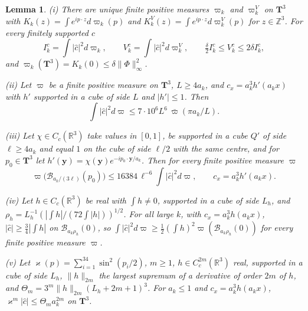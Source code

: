 \documentclass[aps,prd,twocolumn,superscriptaddress,nofootinbib,longbibliography,floatfix,amsmath,amssymb,10pt]{revtex4-2}
\newtheorem{lemma}[theorem]{Lemma}
\theoremstyle{definition}
\theoremstyle{remark}
\newcommand{\R}{\mathbb{R}}
\newcommand{\Z}{\mathbb{Z}}
\begin{document}
\begin{lemma}\label{lem:spatialmeasure}
\textup{(i)} There are unique finite positive measures $\varpi_k$ and
$\varpi^V_k$ on $\mathbf T^3$ with $K_k(z)=\int e^{ip\cdot z}d\varpi_k(p)$
and $K^V_k(z)=\int e^{ip\cdot z}d\varpi^V_k(p)$ for $z\in\Z^3$. For every
finitely supported $c$
\[
I^c_k=\int|\hat c|^2d\varpi_k,\qquad V^c_k=\int|\hat c|^2d\varpi^V_k,
\qquad\tfrac\delta2I^c_k\le V^c_k\le2\delta I^c_k ,
\]
and $\varpi_k(\mathbf T^3)=K_k(0)\le\delta\|\Phi\|_\infty^2$.

\textup{(ii)} Let $\varpi$ be a finite positive measure on $\mathbf T^3$,
$L\ge4a_k$, and $c_x=a_k^3h'(a_kx)$ with $h'$ supported in a cube of side
$L$ and $|h'|\le1$. Then
\[
\int|\hat c|^2d\varpi\le7\cdot10^6L^6\,\bar\varpi(\pi a_k/L) .
\]

\textup{(iii)} Let $\chi\in C_c(\R^3)$ take values in $[0,1]$, be
supported in a cube $Q'$ of side $\ell\ge4a_k$ and equal $1$ on the cube of
side $\ell/2$ with the same centre, and for $p_0\in\mathbf T^3$ let
$h'(\mathbf y)=\chi(\mathbf y)e^{-ip_0\cdot\mathbf y/a_k}$. Then for every
finite positive measure $\varpi$
\[
\varpi\bigl(\mathcal B_{a_k/(3\ell)}(p_0)\bigr)\le16384\,\ell^{-6}\!\int
|\hat c|^2d\varpi,\qquad c_x=a_k^3h'(a_kx).
\]

\textup{(iv)} Let $h\in C_c(\R^3)$ be real with $\int h\ne0$, supported in
a cube of side $L_h$, and $\rho_h=L_h^{-1}(|\int h|/(72\int|h|))^{1/2}$.
For all large $k$, with $c_x=a_k^3h(a_kx)$, $|\hat c|\ge\frac34|\int h|$ on
$\mathcal B_{a_k\rho_h}(0)$, so $\int|\hat c|^2d\varpi\ge\frac12(\int h)^2
\varpi(\mathcal B_{a_k\rho_h}(0))$ for every finite positive measure
$\varpi$.

\textup{(v)} Let $\varkappa(p)=\sum_{i=1}^34\sin^2(p_i/2)$, $m\ge1$, $h\in
C^{2m}_c(\R^3)$ real, supported in a cube of side $L_h$, $\|h\|_{2m}$ the
largest supremum of a derivative of order $2m$ of $h$, and $\Theta_m=3^m
\|h\|_{2m}(L_h+2m+1)^3$. For $a_k\le1$ and $c_x=a_k^3h(a_kx)$,
$\varkappa^m|\hat c|\le\Theta_ma_k^{2m}$ on $\mathbf T^3$.
\end{lemma}
\end{document}
